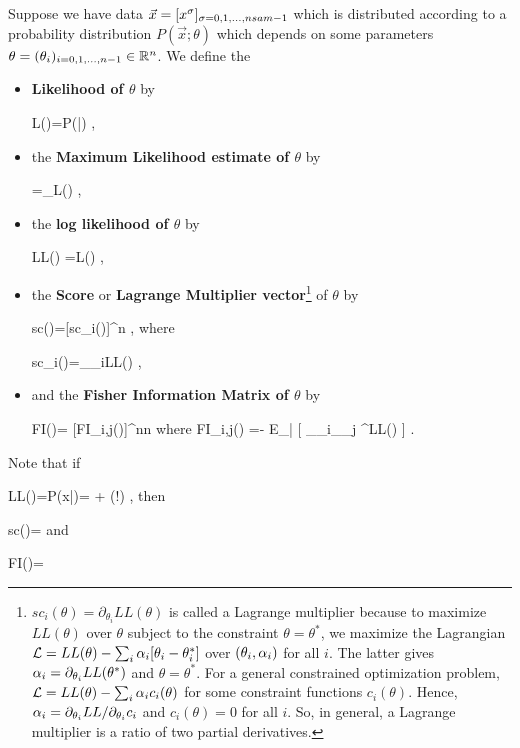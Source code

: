 Suppose we have
data $\vec{x}=[x^\sigma]_{\sigma=0, 1, \ldots,
nsam-1}$ which is distributed
according to
a probability distribution
$P(\vec{x};\theta)$
which depends
on some parameters $\theta=
(\theta_i)_{i=0, 1, \ldots,n-1}\in { \mathbb{R}}^n$.
We define the
\begin{itemize}
\item
{\bf Likelihood of $\theta$} by

\beq
L(\theta)=P(|\theta)
\;,
\eeq
\item
the {\bf Maximum Likelihood estimate
of $\theta$} by

\beq
\HAT{\theta}=\argmax_\theta L(\theta)
\;,
\eeq
\item
the
{\bf log likelihood of $\theta$} by

\beq
LL(\theta) =\ln L(\theta)
\;,
\eeq
\item
the {\bf Score} or {\bf Lagrange
Multiplier vector}\footnote{$sc_i(\theta)=
\partial_{\theta_i}LL(\theta)$
is called a Lagrange multiplier
because to maximize $LL(\theta)$
over $\theta$ subject to
the constraint $\theta=\theta^*$,
we maximize
the Lagrangian ${\cal L}= LL(\theta)
-\sum_i \alpha_i[\theta_i - \theta^*_i]$ over
$(\theta_i,\alpha_i)$ for all $i$. The latter
gives $\alpha_i=\partial_{\theta_i}LL(\theta^*)$
and $\theta=\theta^*$.
For a general
constrained optimization
problem, ${\cal L}=LL(\theta)-\sum_i \alpha_ic_i(\theta)$
for some constraint functions $c_i(\theta)$.
Hence, $\alpha_i=\partial_{\theta_i}LL/
\partial_{\theta_i}c_i$
and $c_i(\theta)=0$
for all $i$.
So, in general,
a Lagrange multiplier
is a ratio of two partial
derivatives.} of $\theta$ by

\beq
sc(\theta)=[sc_i(\theta)]\in \RR^n
\;,
\eeq
where

\beq
sc_i(\theta)=\partial_{\theta_i}LL(\theta)
\;,
\eeq
\item
and the
{\bf Fisher Information Matrix
of $\theta$} by

\beq
FI(\theta)= [FI_{i,j}(\theta)]\in \RR^{n\times n}
\eeq
where
\beq
FI_{i,j}(\theta)
=-
E_{\vec{\rvx}|\theta}
[
\partial_{\theta_i}\partial_{\theta_j}
^{LL(\theta)}
]
\;.
\eeq
\end{itemize}

Note that if

\beq
LL(\theta)=\ln P(x|\theta)=
  + \caln(!\theta)
\;,
\label{eq-normal-ll}
\eeq
then

\beq
sc(\theta)=
\eeq
and

\beq
FI(\theta)=
\eeq



